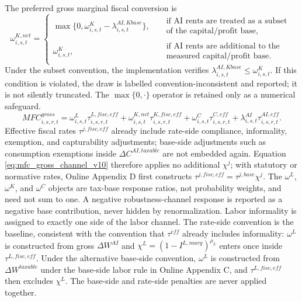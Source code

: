 \documentclass[11pt,a4paper]{article}
\begin{document}
The preferred gross marginal fiscal conversion is
\begin{equation}\label{eq:omega_k_net_v16}
    \omega^{K,net}_{i,s,t}=\begin{cases}
    \max\{0,\omega^K_{i,s,t}-\lambda^{AI,Kbase}_{i,s,t}\}, &
    \begin{aligned}
    &\text{if AI rents are treated as a subset}\\
    &\text{of the capital/profit base},
    \end{aligned}\\
    \omega^K_{i,s,t}, &
    \begin{aligned}
    &\text{if AI rents are additional to the}\\
    &\text{measured capital/profit base}.
    \end{aligned}
    \end{cases}
\end{equation}
Under the subset convention, the implementation verifies $\lambda^{AI,Kbase}_{i,s,t}\leq\omega^K_{i,s,t}$. If this condition is violated, the draw is labelled convention-inconsistent and reported; it is not silently truncated. The $\max\{0,\cdot\}$ operator is retained only as a numerical safeguard.
\begin{equation}\label{eq:mfc_gross_channel_v10}
    MFC^{gross}_{i,s,r,t}
    =
    \omega^L_{i,s,t}\tau^{L,fisc,eff}_{i,s,r,t}
    +\omega^{K,net}_{i,s,t}\tau^{K,fisc,eff}_{i,s,r,t}
    +\omega^C_{i,s,t}\tau^{C,eff}_{i,s,r,t}
    +\lambda^{AI}_{i,s,t}\tau^{AI,eff}_{i,s,r,t}.
\end{equation}
Effective fiscal rates $\tau^{j,fisc,eff}$ already include rate-side compliance, informality, exemption, and capturability adjustments; base-side adjustments such as consumption exemptions inside $\Delta C^{AI,taxable}$ are not embedded again. Equation \eqref{eq:mfc_gross_channel_v10} therefore applies no additional $\chi^j$; with statutory or normative rates, Online Appendix D first constructs $\tau^{j,fisc,eff}=\tau^{j,base}\chi^j$. The $\omega^L$, $\omega^K$, and $\omega^C$ objects are tax-base response ratios, not probability weights, and need not sum to one. A negative robustness-channel response is reported as a negative base contribution, never hidden by renormalization.
Labor informality is assigned to exactly one side of the labor channel. The rate-side convention is the baseline, consistent with the convention that $\tau^{eff}$ already includes informality: $\omega^L$ is constructed from gross $\Delta W^{AI}$ and $\chi^L=(1-I^{L,marg})^{\rho_L}$ enters once inside $\tau^{L,fisc,eff}$. Under the alternative base-side convention, $\omega^L$ is constructed from $\Delta W^{taxable}$ under the base-side labor rule in Online Appendix C, and $\tau^{L,fisc,eff}$ then excludes $\chi^L$. The base-side and rate-side penalties are never applied together.
\end{document}
